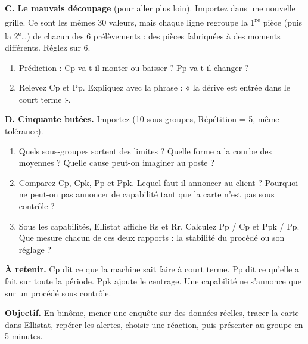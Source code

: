 \documentclass[10pt,a4paper]{article}
\begin{document}
\textbf{C. Le mauvais découpage} (pour aller plus loin). Importez  dans une nouvelle grille. Ce sont les mêmes 30 valeurs, mais chaque ligne regroupe la 1\textsuperscript{re} pièce (puis la 2\textsuperscript{e}…) de chacun des 6 prélèvements : des pièces fabriquées à des moments différents. Réglez  sur 6.
\begin{enumerate}[label=\textcolor{cyan}{\textbf{Q\arabic*.}},leftmargin=22pt,resume]
\item Prédiction : Cp va-t-il monter ou baisser ? Pp va-t-il changer ?\reponse
\item Relevez Cp et Pp. Expliquez avec la phrase : « la dérive est entrée dans le court terme ».\reponse[2]
\end{enumerate}

\newpage
\textbf{D. Cinquante butées.} Importez  (10 sous-groupes, Répétition = 5, même tolérance).
\begin{enumerate}[label=\textcolor{cyan}{\textbf{Q\arabic*.}},leftmargin=22pt,resume]
\item Quels sous-groupes sortent des limites ? Quelle forme a la courbe des moyennes ? Quelle cause peut-on imaginer au poste ?\reponse[2]
\item Comparez Cp, Cpk, Pp et Ppk. Lequel faut-il annoncer au client ? Pourquoi ne peut-on pas annoncer de capabilité tant que la carte n'est pas sous contrôle ?\reponse[2]
\item Sous les capabilités, Ellistat affiche Rs et Rr. Calculez Pp / Cp et Ppk / Pp. Que mesure chacun de ces deux rapports : la stabilité du procédé ou son réglage ?\reponse[2]
\end{enumerate}

\begin{tcolorbox}[boite]
\textbf{À retenir.} Cp dit ce que la machine sait faire à court terme. Pp dit ce qu'elle a fait sur toute la période. Ppk ajoute le centrage. Une capabilité ne s'annonce que sur un procédé sous contrôle.
\end{tcolorbox}

\newpage
\label{s2}

\textbf{Objectif.} En binôme, mener une enquête sur des données réelles, tracer la carte dans Ellistat, repérer les alertes, choisir une réaction, puis présenter au groupe en 5 minutes.
\end{document}
